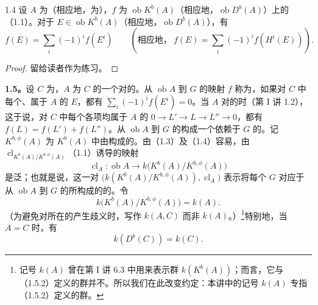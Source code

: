 \begin{SGAresult}{}{1.4}
设 $A$ 为（相应地，为），$f$ 为 $\operatorname{ob}K^b(A)$（相应地，$\operatorname{ob}D^b(A)$）上的（1.1）。对于 $E\in\operatorname{ob}K^b(A)$（相应地，$\operatorname{ob}D^b(A)$），有
\[f(E)=\sum_i(-1)^if(E^i)\qquad\left(\text{相应地，}\ f(E)=\sum_i(-1)^if(H^i(E))\right).\]
\end{SGAresult}
\begin{proof}留给读者作为练习。\end{proof}

\textbf{1.5。}设 $C$ 为，$A$ 为 $C$ 的一个对的。从 $\operatorname{ob}A$ 到 $G$ 的映射 $f$ 称为，如果对 $C$ 中每个、属于 $A$ 的 $E$，都有 $\sum_i(-1)^if(E^i)=0$。当 $A$ 对的时（第 I 讲 1.2），这于说，对 $C$ 中每个各项均属于 $A$ 的 $0\to L'\to L\to L''\to0$，都有 $f(L)=f(L')+f(L'')$。从 $\operatorname{ob}A$ 到 $G$ 的构成一个依赖于 $G$ 的。记 $K^{b,\phi}(A)$ 为 $K^b(A)$ 中由构成的。由（1.3）及（1.4）容易，由 $\operatorname{cl}_{K^b(A)/K^{b,\phi}(A)}$（1.1）诱导的映射
\[\operatorname{cl}_A:\operatorname{ob}A\longrightarrow k\bigl(K^b(A)/K^{b,\phi}(A)\bigr)\tag{1.5.1}\]
是泛；也就是说，这一对 $\bigl(k(K^b(A)/K^{b,\phi}(A)),\operatorname{cl}_A\bigr)$ 表示将每个 $G$ 对应于从 $\operatorname{ob}A$ 到 $G$ 的所构成的的。令
\[k\bigl(K^b(A)/K^{b,\phi}(A)\bigr)=k(A).\tag{1.5.2}\]
（为避免对所在的产生歧义时，写作 $k(A,C)$ 而非 $k(A)$。）\footnote{记号 $k(A)$ 曾在第 I 讲 6.3 中用来表示群 $k(K^b(A))$；而言，它与（1.5.2）定义的群并不。所以我们在此改变约定：本讲中的记号 $k(A)$ 专指（1.5.2）定义的群。}特别地，当 $A=C$ 时，有
\[k(D^b(C))=k(C).\tag{1.5.3}\]

